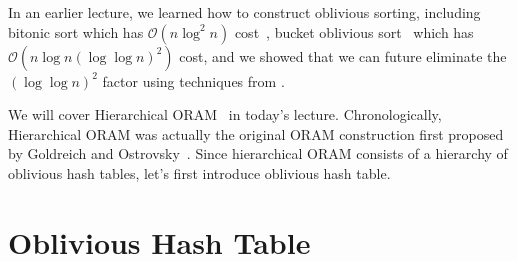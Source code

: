 \newcommand{\rsmpl}{\xleftarrow{\$}}

\newcommand{\alg}{\textsc{Alg}}

\newcommand{\ap}{\textsc{AccessPattern}}
\newtheorem{nonexample}[theorem]{Non-Example}


In an earlier lecture, we learned how to construct oblivious sorting, including bitonic sort which has $\mathcal{O}(n \log^2 n)$ cost~\cite{Batcher}, bucket oblivious sort~\cite{bucket} which has $\mathcal{O}(n \log n (\log \log n)^2)$ cost, 
and we showed that we can future eliminate the $(\log \log n)^2$ factor using
techniques from 
\cite{domulticore, tianyao-sort}.

We will cover Hierarchical ORAM~\cite{10.1145/233551.233553} 
in today's lecture.
Chronologically, 
Hierarchical ORAM 
was actually the original ORAM construction  
first proposed by Goldreich and Ostrovsky~\cite{10.1145/233551.233553}. 
Since hierarchical ORAM consists of a hierarchy of oblivious hash tables,
let's first introduce oblivious hash table.

\section{Oblivious Hash Table}

